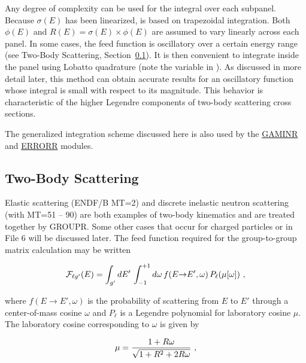 Any degree of complexity can be used for the integral over each subpanel.
Because $\sigma(E)$ has been linearized,  is based on
trapezoidal integration.  Both $\phi(E)$ and
$R(E)=\sigma(E){\times}\phi(E)$ are assumed to vary linearly across each
panel.  In some cases, the feed function is oscillatory over a certain
energy range (see Two-Body Scattering, Section~\ref{ssGROUPR_TwoBody}).
It is then convenient to integrate inside the panel using Lobatto
quadrature\cite{ref13} (note the variable
 in ).  As discussed
in more detail later, this method can obtain accurate results
for an oscillatory function whose integral is small with respect to its
magnitude.  This behavior is characteristic of the higher Legendre
components of two-body scattering cross sections.

The generalized integration scheme discussed here is also used by
the \hyperlink{sGAMINRhy}{GAMINR}
and \hyperlink{sERRORRhy}{ERRORR} modules.

\subsection{Two-Body Scattering}
\label{ssGROUPR_TwoBody}

Elastic scattering (ENDF/B MT=2) and discrete inelastic neutron
scattering (with MT=51 -- 90) are both examples of two-body kinematics
 and are treated together by GROUPR.  Some
other cases that occur for charged particles or in
File 6 will be discussed later.  The
feed function required for the group-to-group matrix calculation
may be written

  \begin{equation}
    {\cal F}_{\ell g'}(E)=\int_{g'}dE'\,\int_{-1}^{+1}d\omega\,
    f(E{\rightarrow}E',\omega)\,P_{\ell}(\mu[\omega])\,\,,
  \label{Eq71}
  \end{equation}

\noindent
where $f(E{\rightarrow}E',\omega)$ is the probability of scattering
from $E$ to $E'$ through a center-of-mass cosine $\omega$ and $P_{\ell}$
is a Legendre polynomial for laboratory cosine $\mu$.  The laboratory
cosine corresponding to $\omega$ is given by

  \begin{equation}
    \mu={{1+R\omega}\over
    {\sqrt{1+R^2+2R\omega }}}\,\,,
  \label{Eq72}
  \end{equation}

